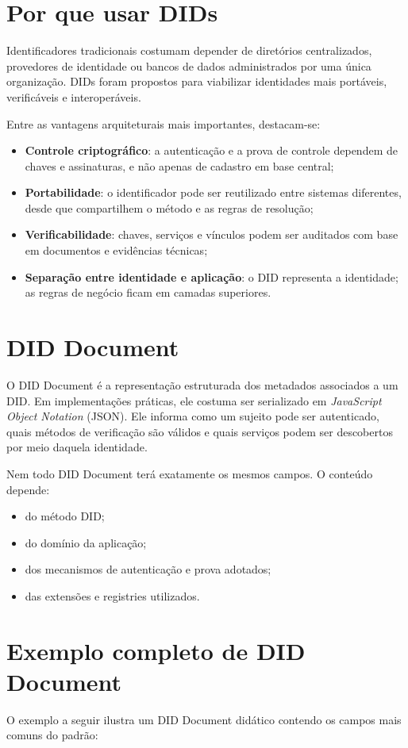 \section{Por que usar DIDs}
Identificadores tradicionais costumam depender de diretórios centralizados, provedores de identidade ou bancos de dados administrados por uma única organização. DIDs foram propostos para viabilizar identidades mais portáveis, verificáveis e interoperáveis.

Entre as vantagens arquiteturais mais importantes, destacam-se:
\begin{itemize}[leftmargin=*]
  \item \textbf{Controle criptográfico}: a autenticação e a prova de controle dependem de chaves e assinaturas, e não apenas de cadastro em base central;
  \item \textbf{Portabilidade}: o identificador pode ser reutilizado entre sistemas diferentes, desde que compartilhem o método e as regras de resolução;
  \item \textbf{Verificabilidade}: chaves, serviços e vínculos podem ser auditados com base em documentos e evidências técnicas;
  \item \textbf{Separação entre identidade e aplicação}: o DID representa a identidade; as regras de negócio ficam em camadas superiores.
\end{itemize}

\section{DID Document}
O DID Document é a representação estruturada dos metadados associados a um DID. Em implementações práticas, ele costuma ser serializado em \textit{JavaScript Object Notation} (JSON). Ele informa como um sujeito pode ser autenticado, quais métodos de verificação são válidos e quais serviços podem ser descobertos por meio daquela identidade.

Nem todo DID Document terá exatamente os mesmos campos. O conteúdo depende:
\begin{itemize}[leftmargin=*]
  \item do método DID;
  \item do domínio da aplicação;
  \item dos mecanismos de autenticação e prova adotados;
  \item das extensões e registries utilizados.
\end{itemize}

\section{Exemplo completo de DID Document}
O exemplo a seguir ilustra um DID Document didático contendo os campos mais comuns do padrão:

